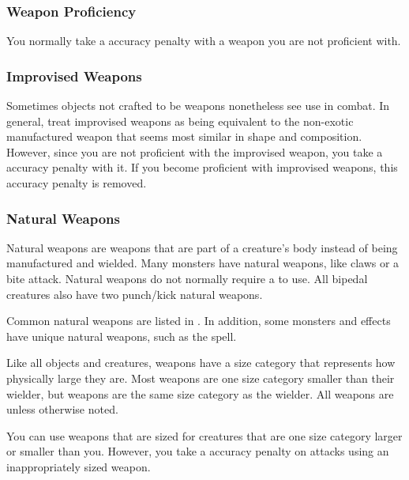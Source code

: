     \subsubsection{Weapon Proficiency}\label{Weapon Proficiency}
      You normally take a  accuracy penalty with a weapon you are not proficient with.

    \subsubsection{Improvised Weapons}\label{Improvised Weapons}
      Sometimes objects not crafted to be weapons nonetheless see use in combat.
      In general, treat improvised weapons as being equivalent to the non-exotic manufactured weapon that seems most similar in shape and composition.
      However, since you are not proficient with the improvised weapon, you take a  accuracy penalty with it.
      If you become proficient with improvised weapons, this accuracy penalty is removed.

    \subsubsection{Natural Weapons}\label{Natural Weapons}
      Natural weapons are weapons that are part of a creature's body instead of being manufactured and wielded.
      Many monsters have natural weapons, like claws or a bite attack.
      Natural weapons do not normally require a  to use.
      All bipedal creatures also have two punch/kick natural weapons.

      Common natural weapons are listed in .
      In addition, some monsters and effects have unique natural weapons, such as the  spell.

       Like all objects and creatures, weapons have a size category that represents how physically large they are. Most weapons are one size category smaller than their wielder, but  weapons are the same size category as the wielder.
      All weapons are  unless otherwise noted.

       You can use weapons that are sized for creatures that are one size category larger or smaller than you.
      However, you take a  accuracy penalty on attacks using an inappropriately sized weapon.

